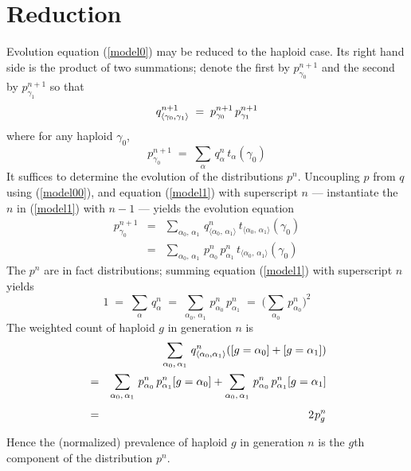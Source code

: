 \section{Reduction}
Evolution equation (\ref{model0}) may be reduced to the haploid case.
Its right hand side is the product of two summations; denote the first
by $p_{\gamma_0}^{n+1}$ and the second by $p_{\gamma_1}^{n+1}$ so that
\begin{equation}
\label{model1}
q_{\langle \gamma_0, \gamma_1 \rangle}^{n+1} \; = \;
p_{\gamma_0}^{n+1} \, p_{\gamma_1}^{n+1}\\[.05in]
\end{equation}
where for any haploid $\gamma_0$,
\begin{equation}
\label{model00}
p_{\gamma_0}^{n+1} \; = \;
\sum_{\alpha} \,q_\alpha^n \, t_\alpha(\gamma_0)
\end{equation}
It suffices to determine the evolution of the distributions $p^{n}$.
Uncoupling \nudge $p$ \nudge from \nudge $q$ \nudge using
(\ref{model00}), and equation (\ref{model1}) with superscript $n$ ---
instantiate the $n$ in (\ref{model1}) with $n-1$ --- yields the
evolution equation
\begin{eqnarray}
\label{model2}
p_{\gamma_0}^{n+1} & = &
\sum_{\alpha_0, \, \alpha_1} \, q_{\langle \alpha_0, \,\alpha_1 \rangle}^n \,
t_{\langle \alpha_0, \,\alpha_1 \rangle}(\gamma_0) \nonumber \\
& = &
\sum_{\alpha_0, \, \alpha_1} \, p_{\alpha_0}^n \, p_{\alpha_1}^n \,
t_{\langle \alpha_0, \,\alpha_1 \rangle}(\gamma_0) 
\end{eqnarray}
The $p^n$ are in fact distributions; summing equation
(\ref{model1}) with superscript $n$ yields
\[
1 \; = \; \sum_\alpha \, q_\alpha^n \; = \;
\sum_{\alpha_0, \, \alpha_1} \, p_{\alpha_0}^n \, p_{\alpha_1}^n \; = \;
\Big( \sum_{\alpha_0} \, p_{\alpha_0}^n \Big)^2
\]
The weighted count of haploid
$g$ in generation $n$ is
\begin{eqnarray}
\label{project}
  & &
  \sum_{\alpha_0, \, \alpha_1} \, q_{\langle \alpha_0, \alpha_1 \rangle}^n
([g = \alpha_0] + [g = \alpha_1]) \\ & = &
\sum_{\alpha_0, \, \alpha_1} \, p_{\alpha_0}^n \, p_{\alpha_1}^n [g = \alpha_0] + 
\sum_{\alpha_0, \, \alpha_1} \, p_{\alpha_0}^n \, p_{\alpha_1}^n [g = \alpha_1] \\[0.05in]
& = & 2 \hspace{0.01in} p_g^n
\end{eqnarray}

Hence the (normalized) prevalence of haploid $g$ in generation $n$ is 
the $g$th component of the distribution $p^n$. 

